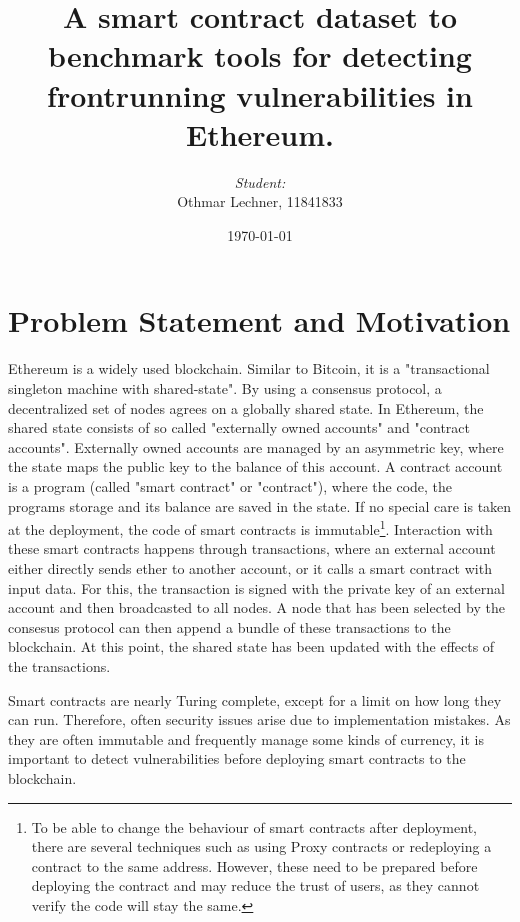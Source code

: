 \documentclass[paper=a4,fontsize=11pt,oneside,titlepage]{scrartcl}
\title{A smart contract dataset to benchmark tools for detecting frontrunning vulnerabilities in Ethereum.}
\author{\textit{Student:}\\
Othmar Lechner, 11841833}
\date{\today}
\begin{document}
\thispagestyle{empty}
\maketitle
\newpage

\section{Problem Statement and Motivation}
\label{sec:problem}

Ethereum is a widely used blockchain. Similar to Bitcoin, it is a "transactional singleton machine with shared-state"\cite{wood_ethereum_2023}. By using a consensus protocol, a decentralized set of nodes agrees on a globally shared state. In Ethereum, the shared state consists of so called "externally owned accounts" and "contract accounts". Externally owned accounts are managed by an asymmetric key, where the state maps the public key to the balance of this account. A contract account is a program (called "smart contract" or "contract"), where the code, the programs storage and its balance are saved in the state\cite{tikhomirov_ethereum_2018}. If no special care is taken at the deployment, the code of smart contracts is immutable\footnote{To be able to change the behaviour of smart contracts after deployment, there are several techniques such as using Proxy contracts or redeploying a contract to the same address\cite{salehi_not_2022}. However, these need to be prepared before deploying the contract and may reduce the trust of users, as they cannot verify the code will stay the same.}\cite{salehi_not_2022}. Interaction with these smart contracts happens through transactions, where an external account either directly sends ether to another account, or it calls a smart contract with input data. For this, the transaction is signed with the private key of an external account and then broadcasted to all nodes. A node that has been selected by the consesus protocol can then append a bundle of these transactions to the blockchain. At this point, the shared state has been updated with the effects of the transactions\cite{tikhomirov_ethereum_2018}.

Smart contracts are nearly Turing complete, except for a limit on how long they can run\cite{tikhomirov_ethereum_2018}. Therefore, often security issues arise due to implementation mistakes. As they are often immutable and frequently manage some kinds of currency, it is important to detect vulnerabilities before deploying smart contracts to the blockchain.
\end{document}
